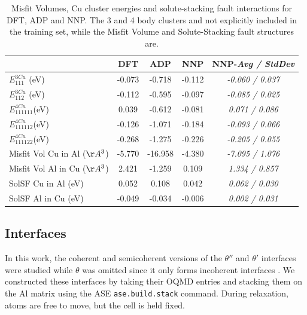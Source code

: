 \documentclass{article}
\begin{document}
\begin{table}[h!]
\begin{tabular}{l|cccc}%
\hline%
&DFT&ADP&NNP& NNP-\emph{Avg / StdDev}\\%
\hline%
$E^{3Cu}_{111}$ (eV)&-0.073&{-}0.718&{-}0.112&\emph{-0.060 / 0.037}\\%
$E^{3Cu}_{112}$ (eV)&-0.112&{-}0.595&{-}0.097&\emph{-0.085 / 0.025}\\%
$E^{4Cu}_{111111}$(eV)&0.039&{-}0.612&{-}0.081&\emph{0.071 / 0.086}\\%
$E^{4Cu}_{111112}$(eV)&-0.126&{-}1.071&{-}0.184&\emph{-0.093 / 0.066}\\%
$E^{4Cu}_{111122}$(eV)&-0.268&{-}1.275&{-}0.226&\emph{-0.205 / 0.055}\\%
Misfit Vol Cu in Al ($\AA^3$)&{-}5.770&{-}16.958&{-}4.380&\emph{-7.095 / 1.076}\\%
Misfit Vol Al in Cu ($\AA^3$)&2.421&{-}1.259&0.109&\emph{1.334 / 0.857}\\%
SolSF Cu in Al (eV)&0.052&0.108&0.042&\emph{0.062 / 0.030}\\%
SolSF Al in Cu (eV)&{-}0.049&{-}0.034&{-}0.006&\emph{0.002 / 0.031}\\%
\end{tabular}%
\caption{Misfit Volumes, Cu cluster energies and solute-stacking fault interactions for DFT, ADP and NNP. 
The 3 and 4 body clusters and not explicitly included in the training set, while the Misfit Volume and 
Solute-Stacking fault structures are.}
\label{table:solute_special}
\end{table}

\subsection{Interfaces}
In this work, the coherent and semicoherent versions of the $\theta''$ and $\theta'$ interfaces were studied while $\theta$ was omitted since it only forms incoherent interfaces \cite{Nie2014PhysicalAlloys}.
We constructed these interfaces by taking their OQMD entries and stacking them on the Al matrix using the ASE \texttt{ase.build.stack} command.
During relaxation, atoms are free to move, but the cell is held fixed. 
\end{document}
